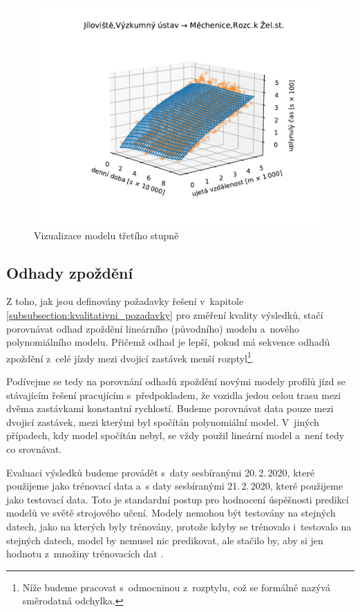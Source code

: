 \begin{figure}
   \centering
 \includegraphics[width=\linewidth]{../img/thrd_degree}
 \caption{Vizualizace modelu třetího stupně}
 \label{fig:thrd_degree}
\end{figure}


\subsection{Odhady zpoždění} \label{subsection:odhady_zpozdeni}

Z toho, jak jsou definovány požadavky řešení v~kapitole \ref{subsubsection:kvalitativni_pozadavky} pro změření kvality výsledků, stačí porovnávat odhad zpoždění lineárního (původního) modelu a~nového polynomiálního modelu. Přičemž odhad je lepší, pokud má sekvence odhadů zpoždění z~celé jízdy mezi dvojicí zastávek menší rozptyl\footnote{Níže budeme pracovat s~odmocninou z~rozptylu, což se formálně nazývá směrodatná odchylka.}.


\bigbreak

Podívejme se tedy na porovnání odhadů zpoždění novými modely profilů jízd se stávajícím řešení pracujícím s~předpokladem, že vozidla jedou celou trasu mezi dvěma zastávkami konstantní rychlostí. Budeme porovnávat data pouze mezi dvojicí zastávek, mezi kterými byl spočítán polynomiální model. V~jiných případech, kdy model spočítán nebyl, se vždy použil lineární model a~není tedy co srovnávat.


\bigbreak

Evaluaci výsledků budeme provádět s~daty sesbíranými 20.\,2.\,2020, které použijeme jako trénovací data a~s daty sesbíranými 21.\,2.\,2020, které použijeme jako testovací data. Toto je standardní postup pro hodnocení úspěšnosti predikcí modelů ve světě strojového učení. Modely nemohou být testovány na stejných datech, jako na kterých byly trénovány, protože kdyby se trénovalo i~testovalo na stejných datech, model by nemusel nic predikovat, ale stačilo by, aby si jen  hodnotu z~množiny trénovacích dat \citep[viz][Strana 30]{Gareth13}.

